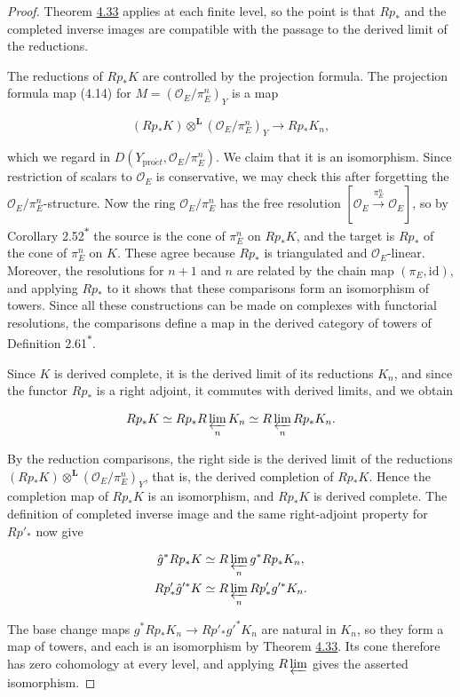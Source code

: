 \documentclass[11pt]{article}
\newcommand{\bpout}[1]{#1\textsuperscript{\hyperlink{bp-outside}{\ensuremath{\ast}}}}
\begin{document}
\begin{proof}[{Proof}]\label{bp114}%
Theorem \hyperref[bp98]{4.33} applies at each finite level, so the point is that \(Rp_*\) and the completed inverse images are compatible with the passage to the derived limit of the reductions.

The reductions of \(Rp_*K\) are controlled by the projection formula. The projection formula map (4.14) for \(M=(\mathcal O_E/\pi_E^n)_Y\) is a map

\[
(Rp_*K)\otimes^{\mathbf L}(\mathcal O_E/\pi_E^n)_Y
\longrightarrow Rp_*K_n,
\]

which we regard in \(D(Y_{\mathrm{pro}\acute{e}t},\mathcal O_E/\pi_E^n)\). We claim that it is an isomorphism. Since restriction of scalars to \(\mathcal O_E\) is conservative, we may check this after forgetting the \(\mathcal O_E/\pi_E^n\)-structure. Now the ring \(\mathcal O_E/\pi_E^n\) has the free resolution \([\mathcal O_E\xrightarrow{\pi_E^n}\mathcal O_E]\), so by Corollary \bpout{2.52} the source is the cone of \(\pi_E^n\) on \(Rp_*K\), and the target is \(Rp_*\) of the cone of \(\pi_E^n\) on \(K\). These agree because \(Rp_*\) is triangulated and \(\mathcal O_E\)-linear. Moreover, the resolutions for \(n+1\) and \(n\) are related by the chain map \((\pi_E,\mathrm{id})\), and applying \(Rp_*\) to it shows that these comparisons form an isomorphism of towers. Since all these constructions can be made on complexes with functorial resolutions, the comparisons define a map in the derived category of towers of Definition \bpout{2.61}.

Since \(K\) is derived complete, it is the derived limit of its reductions \(K_n\), and since the functor \(Rp_*\) is a right adjoint, it commutes with derived limits, and we obtain

\[
Rp_*K\simeq Rp_*R\varprojlim_nK_n
\simeq R\varprojlim_nRp_*K_n.
\]

By the reduction comparisons, the right side is the derived limit of the reductions \((Rp_*K)\otimes^{\mathbf L}(\mathcal O_E/\pi_E^n)_Y\), that is, the derived completion of \(Rp_*K\). Hence the completion map of \(Rp_*K\) is an isomorphism, and \(Rp_*K\) is derived complete. The definition of completed inverse image and the same right-adjoint property for \(Rp'_*\) now give

\[
\begin{aligned}
\hat g^*Rp_*K
&\simeq R\varprojlim_n g^*Rp_*K_n,\\
Rp'_*\hat g'^*K
&\simeq R\varprojlim_n Rp'_*g'^*K_n.
\end{aligned}
\]

The base change maps \(g^*Rp_*K_n\to Rp'_*g'^*K_n\) are natural in \(K_n\), so they form a map of towers, and each is an isomorphism by Theorem \hyperref[bp98]{4.33}. Its cone therefore has zero cohomology at every level, and applying \(R\varprojlim\) gives the asserted isomorphism.
\end{proof}
\end{document}
